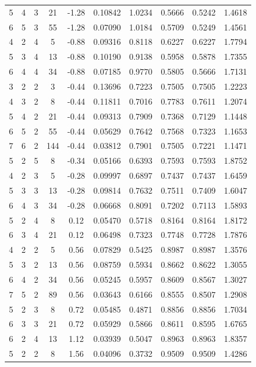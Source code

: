 \documentclass[11pt,a4paper]{ctexart}
\theoremstyle{definition}
\begin{document}
\begin{table}[h]
\begin{tabular}{cccccccccc}
5 & 4 & 3 & 21 & -1.28 & 0.10842 & 1.0234 & 0.5666 & 0.5242 & 1.4618 \\
6 & 5 & 3 & 55 & -1.28 & 0.07090 & 1.0184 & 0.5709 & 0.5249 & 1.4561 \\
4 & 2 & 4 & 5 & -0.88 & 0.09316 & 0.8118 & 0.6227 & 0.6227 & 1.7794 \\
5 & 3 & 4 & 13 & -0.88 & 0.10190 & 0.9138 & 0.5958 & 0.5878 & 1.7355 \\
6 & 4 & 4 & 34 & -0.88 & 0.07185 & 0.9770 & 0.5805 & 0.5666 & 1.7131 \\
3 & 2 & 2 & 3 & -0.44 & 0.13696 & 0.7223 & 0.7505 & 0.7505 & 1.2223 \\
4 & 3 & 2 & 8 & -0.44 & 0.11811 & 0.7016 & 0.7783 & 0.7611 & 1.2074 \\
5 & 4 & 2 & 21 & -0.44 & 0.09313 & 0.7909 & 0.7368 & 0.7129 & 1.1448 \\
6 & 5 & 2 & 55 & -0.44 & 0.05629 & 0.7642 & 0.7568 & 0.7323 & 1.1653 \\
7 & 6 & 2 & 144 & -0.44 & 0.03812 & 0.7901 & 0.7505 & 0.7221 & 1.1471 \\
5 & 2 & 5 & 8 & -0.34 & 0.05166 & 0.6393 & 0.7593 & 0.7593 & 1.8752 \\
4 & 2 & 3 & 5 & -0.28 & 0.09997 & 0.6897 & 0.7437 & 0.7437 & 1.6459 \\
5 & 3 & 3 & 13 & -0.28 & 0.09814 & 0.7632 & 0.7511 & 0.7409 & 1.6047 \\
6 & 4 & 3 & 34 & -0.28 & 0.06668 & 0.8091 & 0.7202 & 0.7113 & 1.5893 \\
5 & 2 & 4 & 8 & 0.12 & 0.05470 & 0.5718 & 0.8164 & 0.8164 & 1.8172 \\
6 & 3 & 4 & 21 & 0.12 & 0.06498 & 0.7323 & 0.7748 & 0.7728 & 1.7876 \\
4 & 2 & 2 & 5 & 0.56 & 0.07829 & 0.5425 & 0.8987 & 0.8987 & 1.3576 \\
5 & 3 & 2 & 13 & 0.56 & 0.08759 & 0.5934 & 0.8662 & 0.8622 & 1.3055 \\
6 & 4 & 2 & 34 & 0.56 & 0.05245 & 0.5957 & 0.8609 & 0.8567 & 1.3027 \\
7 & 5 & 2 & 89 & 0.56 & 0.03643 & 0.6166 & 0.8555 & 0.8507 & 1.2908 \\
5 & 2 & 3 & 8 & 0.72 & 0.05485 & 0.4871 & 0.8856 & 0.8856 & 1.7034 \\
6 & 3 & 3 & 21 & 0.72 & 0.05929 & 0.5866 & 0.8611 & 0.8595 & 1.6765 \\
6 & 2 & 4 & 13 & 1.12 & 0.03939 & 0.5047 & 0.8963 & 0.8963 & 1.8357 \\
5 & 2 & 2 & 8 & 1.56 & 0.04096 & 0.3732 & 0.9509 & 0.9509 & 1.4286 \\

\end{tabular}
\end{table}
\end{document}
